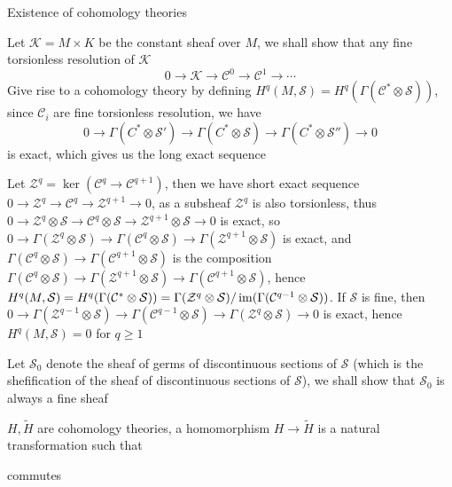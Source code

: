 \documentclass[main]{subfiles}
\begin{document}
Existence of cohomology theories

Let $\mathcal K=M\times K$ be the constant sheaf over $M$, we shall show that any fine torsionless resolution of $\mathcal K$
\[0\to\mathcal K\to \mathcal C^0\to\mathcal C^1\to\cdots\]
Give rise to a cohomology theory by defining $H^q(M,\mathcal S)=H^q(\Gamma(\mathcal C^*\otimes\mathcal S))$, since $\mathcal C_i$ are fine torsionless resolution, we have 
\[0\to\Gamma(C^*\otimes\mathcal S')\to\Gamma(C^*\otimes\mathcal S)\to\Gamma(C^*\otimes\mathcal S'')\to0\]
is exact, which gives us the long exact sequence

Let $\mathcal Z^q=\ker(\mathcal C^q\to\mathcal C^{q+1})$, then we have short exact sequence $0\to\mathcal Z^q\to\mathcal C^q\to\mathcal Z^{q+1}\to0$, as a subsheaf $\mathcal Z^q$ is also torsionless, thus  $0\to\mathcal Z^q\otimes\mathcal S\to\mathcal C^q\otimes\mathcal S\to\mathcal Z^{q+1}\otimes\mathcal S\to0$ is exact, so $0\to\Gamma(\mathcal Z^q\otimes\mathcal S)\to\Gamma(\mathcal C^q\otimes\mathcal S)\to\Gamma(\mathcal Z^{q+1}\otimes\mathcal S)$ is exact, and $\Gamma(\mathcal C^q\otimes\mathcal S)\to\Gamma(\mathcal C^{q+1}\otimes\mathcal S)$ is the composition $\Gamma(\mathcal C^q\otimes\mathcal S)\to\Gamma(\mathcal Z^{q+1}\otimes\mathcal S)\to\Gamma(\mathcal C^{q+1}\otimes\mathcal S)$, hence $H^q(M,\mathcal S)=H^q(\Gamma(\mathcal C^*\otimes\mathcal S))=\Gamma(\mathcal Z^q\otimes\mathcal S)/\operatorname{im}(\Gamma(\mathcal C^{q-1}\otimes\mathcal S))$. If $\mathcal S$ is fine, then  $0\to\Gamma(\mathcal Z^{q-1}\otimes\mathcal S)\to\Gamma(\mathcal C^{q-1}\otimes\mathcal S)\to\Gamma(\mathcal Z^{q}\otimes\mathcal S)\to0$ is exact, hence $H^q(M,\mathcal S)=0$ for $q\geq1$

Let $\mathcal S_0$ denote the sheaf of germs of discontinuous sections of $\mathcal S$ (which is the shefification of the sheaf of discontinuous sections of $\mathcal S$), we shall show that $\mathcal S_0$ is always a fine sheaf

\begin{definition}
$H,\tilde H$ are cohomology theories, a homomorphism $H\to\tilde H$ is a natural transformation such that
\begin{center}
\end{center}
commutes
\end{definition}
\end{document}
